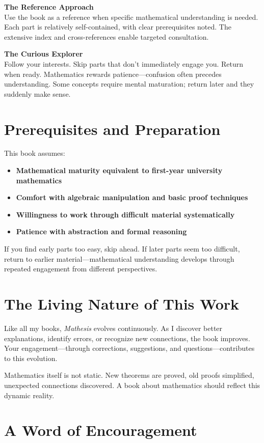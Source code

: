 \textbf{The Reference Approach}\\
Use the book as a reference when specific mathematical understanding is needed. Each part is relatively self-contained, with clear prerequisites noted. The extensive index and cross-references enable targeted consultation.

\textbf{The Curious Explorer}\\
Follow your interests. Skip parts that don't immediately engage you. Return when ready. Mathematics rewards patience—confusion often precedes understanding. Some concepts require mental maturation; return later and they suddenly make sense.

\section*{Prerequisites and Preparation}

This book assumes:
\begin{itemize}
    \item \textbf{Mathematical maturity equivalent to first-year university mathematics}
    \item \textbf{Comfort with algebraic manipulation and basic proof techniques}
    \item \textbf{Willingness to work through difficult material systematically}
    \item \textbf{Patience with abstraction and formal reasoning}
\end{itemize}

If you find early parts too easy, skip ahead. If later parts seem too difficult, return to earlier material—mathematical understanding develops through repeated engagement from different perspectives.

\section*{The Living Nature of This Work}

Like all my books, \textit{Mathesis} evolves continuously. As I discover better explanations, identify errors, or recognize new connections, the book improves. Your engagement—through corrections, suggestions, and questions—contributes to this evolution.

Mathematics itself is not static. New theorems are proved, old proofs simplified, unexpected connections discovered. A book about mathematics should reflect this dynamic reality.

\section*{A Word of Encouragement}

